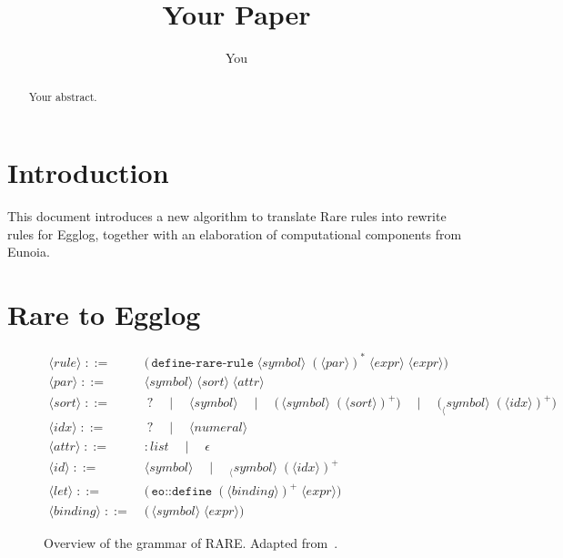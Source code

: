 \documentclass{article}
\title{Your Paper}
\author{You}
\begin{document}
\maketitle

\begin{abstract}
Your abstract.
\end{abstract}

\section{Introduction}

This document introduces a new algorithm to translate Rare rules into rewrite rules for Egglog, together with an elaboration of computational components from Eunoia.

\section{Rare to Egglog}

\begin{figure}[h]
\centering
\[
\begin{aligned}
\langle\mathit{rule}\rangle \;::=&\;\bigl(\,\texttt{define-rare-rule}\;\langle\mathit{symbol}\rangle\;(\langle\mathit{par}\rangle)^*\;\langle\mathit{expr}\rangle\;\langle\mathit{expr}\rangle\bigr)\\
\langle\mathit{par}\rangle\;::=&\;\langle\mathit{symbol}\rangle\;\langle\mathit{sort}\rangle\;\langle\mathit{attr}\rangle\\[0.5ex]
\langle\mathit{sort}\rangle\;::=&\;\ ?\quad\mid\quad \langle\mathit{symbol}\rangle\quad\mid\quad
  \bigl(\,\langle\mathit{symbol}\rangle\;(\langle\mathit{sort}\rangle)^+\bigr)
  \quad\mid\quad
  \bigl(_\langle\mathit{symbol}\rangle\;(\langle\mathit{idx}\rangle)^+\bigr)\\[0.5ex]
\langle\mathit{idx}\rangle\;::=&\;\ ?\quad\mid\quad \langle\mathit{numeral}\rangle\\[0.5ex]
\langle\mathit{attr}\rangle\;::=&\;\mathit{:list}\quad\mid\quad \epsilon\\[0.5ex]
\langle\mathit{id}\rangle\;::=&\;\langle\mathit{symbol}\rangle
  \quad\mid\quad _\langle\mathit{symbol}\rangle\;(\langle\mathit{idx}\rangle)^+\\[0.5ex]
\langle\mathit{let}\rangle\;::=&\;\bigl(\,\texttt{eo::define}\;(\langle\mathit{binding}\rangle)^+\;\langle\mathit{expr}\rangle\bigr)\\[0.5ex]
\langle\mathit{binding}\rangle\;::=&\;\bigl(\,\langle\mathit{symbol}\rangle\;\langle\mathit{expr}\rangle\bigr)
\end{aligned}
\]
\caption{\label{fig:fig1} Overview of the grammar of RARE. Adapted from~\cite{10026573}.}
\end{figure}
\end{document}
